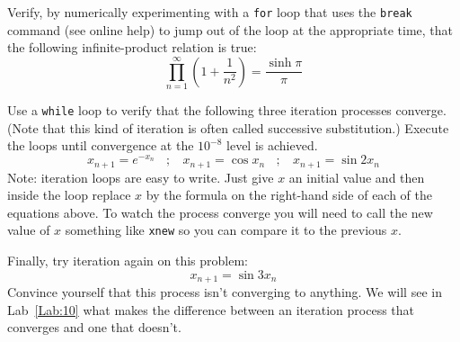 \begin{enumerate}
\subprob Verify, by numerically experimenting with a {\tt for}
    loop that uses the {\tt break} command (see online help) to
    jump out of the loop at the appropriate time, that the
    following infinite-product relation is true:
    \[
        \prod_{n=1}^{\infty} \left( 1 + \frac{1}{n^2} \right)
        = \frac{ \sinh{\pi} }{ \pi }
    \]

\subprob {}  Use a
    {\tt while} loop to verify that the following three iteration
    processes converge. (Note that this kind of iteration is
    often called successive substitution.) Execute the loops
    until convergence at the $10^{-8}$ level is achieved.
    \[
        x_{n+1} = e^{-x_n}~~~~;~~~~
        x_{n+1} = \cos{x_n}~~~~;~~~~
        x_{n+1} = \sin{2 x_n}
    \]
    Note: iteration loops are easy to write. Just give $x$ an
    initial value and then inside the loop replace $x$ by the
    formula on the right-hand side of each of the equations
    above. To watch the process converge you will need to call
    the new value of $x$ something like {\tt xnew} so you can
    compare it to the previous $x$.

    Finally, try iteration again on this problem:
    \[
        x_{n+1} = \sin{3 x_n}
    \]
    Convince yourself that this process isn't converging to
    anything. We will see in Lab~\ref{Lab:10} what makes the
    difference between an iteration process that converges and
    one that doesn't.
\end{enumerate}

\mainmatter

\pagestyle{fancy}
\renewcommand{\chaptermark}[1]{\markboth{Computational Physics 385}{\chaptername \ \thechapter \ \ #1}}
